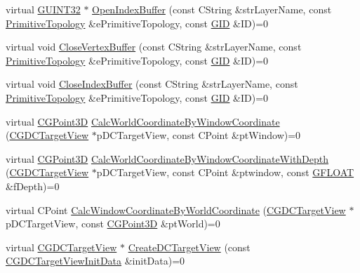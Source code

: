 \begin{DoxyCompactItemize}
\item 
virtual \hyperlink{_g_types_8h_a2e1a1c77d1349057202e2f34e071019c}{G\+U\+I\+N\+T32} $\ast$ \hyperlink{class_c_g_d_c_a87c3ef04d137d2eada5a1286e5ff6833}{Open\+Index\+Buffer} (const C\+String \&str\+Layer\+Name, const \hyperlink{_g_types_8h_a940e3da6a9b57aae3de0b050e2a7af5e}{Primitive\+Topology} \&e\+Primitive\+Topology, const \hyperlink{_g_types_8h_a5b96ecb16d8e437977d12cd40aa6f6d8}{G\+I\+D} \&I\+D)=0
\item 
virtual void \hyperlink{class_c_g_d_c_a0718f84e96ea42c5b41b26f0b0136b5c}{Close\+Vertex\+Buffer} (const C\+String \&str\+Layer\+Name, const \hyperlink{_g_types_8h_a940e3da6a9b57aae3de0b050e2a7af5e}{Primitive\+Topology} \&e\+Primitive\+Topology, const \hyperlink{_g_types_8h_a5b96ecb16d8e437977d12cd40aa6f6d8}{G\+I\+D} \&I\+D)=0
\item 
virtual void \hyperlink{class_c_g_d_c_a5f83a243fa6e31bf29d65ea609e7c8f1}{Close\+Index\+Buffer} (const C\+String \&str\+Layer\+Name, const \hyperlink{_g_types_8h_a940e3da6a9b57aae3de0b050e2a7af5e}{Primitive\+Topology} \&e\+Primitive\+Topology, const \hyperlink{_g_types_8h_a5b96ecb16d8e437977d12cd40aa6f6d8}{G\+I\+D} \&I\+D)=0
\item 
virtual \hyperlink{class_c_g_point3_d}{C\+G\+Point3\+D} \hyperlink{class_c_g_d_c_ac9412c6b566541678fab5b664470a606}{Calc\+World\+Coordinate\+By\+Window\+Coordinate} (\hyperlink{class_c_g_d_c_target_view}{C\+G\+D\+C\+Target\+View} $\ast$p\+D\+C\+Target\+View, const C\+Point \&pt\+Window)=0
\item 
virtual \hyperlink{class_c_g_point3_d}{C\+G\+Point3\+D} \hyperlink{class_c_g_d_c_a5cd3695fef623ea5974e5fd405bc5fa1}{Calc\+World\+Coordinate\+By\+Window\+Coordinate\+With\+Depth} (\hyperlink{class_c_g_d_c_target_view}{C\+G\+D\+C\+Target\+View} $\ast$p\+D\+C\+Target\+View, const C\+Point \&ptwindow, const \hyperlink{_g_types_8h_abf6eba8223df62f199b811a6c52ff2ef}{G\+F\+L\+O\+A\+T} \&f\+Depth)=0
\item 
virtual C\+Point \hyperlink{class_c_g_d_c_ae2b880b14bc65efdee4cebfce8123d63}{Calc\+Window\+Coordinate\+By\+World\+Coordinate} (\hyperlink{class_c_g_d_c_target_view}{C\+G\+D\+C\+Target\+View} $\ast$p\+D\+C\+Target\+View, const \hyperlink{class_c_g_point3_d}{C\+G\+Point3\+D} \&pt\+World)=0
\item 
virtual \hyperlink{class_c_g_d_c_target_view}{C\+G\+D\+C\+Target\+View} $\ast$ \hyperlink{class_c_g_d_c_ac673cd6274374adc8059e3395317dc90}{Create\+D\+C\+Target\+View} (const \hyperlink{class_c_g_d_c_target_view_init_data}{C\+G\+D\+C\+Target\+View\+Init\+Data} \&init\+Data)=0

\end{DoxyCompactItemize}
